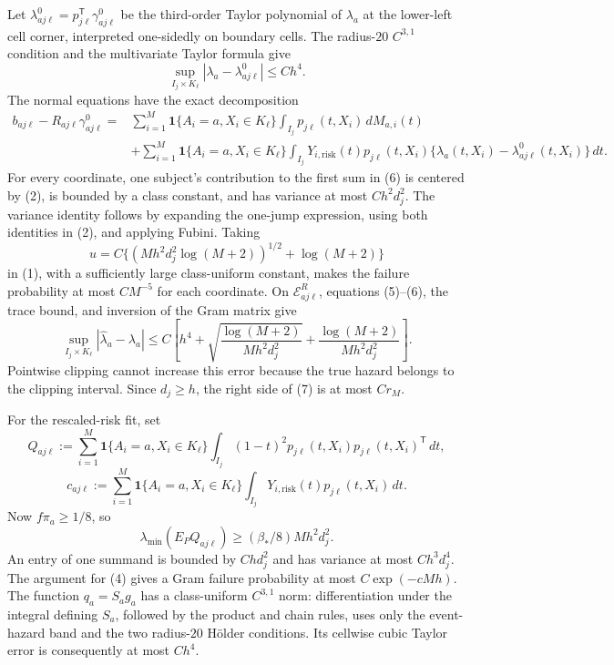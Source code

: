 Let \(\lambda^0_{aj\ell}=p_{j\ell}^{\mathsf T}\gamma^0_{aj\ell}\) be the third-order Taylor polynomial of \(\lambda_a\) at the lower-left cell corner, interpreted one-sidedly on boundary cells. The radius-\(20\) \(C^{3,1}\) condition and the multivariate Taylor formula give
\[
\sup_{I_j\times K_\ell}|\lambda_a-\lambda^0_{aj\ell}|\le Ch^4. \tag{5}
\]
The normal equations have the exact decomposition
\[
\begin{split}
b_{aj\ell}-R_{aj\ell}\gamma^0_{aj\ell}
={}&\sum_{i=1}^M\mathbf 1\{A_i=a,X_i\in K_\ell\}
\int_{I_j}p_{j\ell}(t,X_i)\,dM_{a,i}(t)\\
&+\sum_{i=1}^M\mathbf 1\{A_i=a,X_i\in K_\ell\}
\int_{I_j}Y_{i,\mathrm{risk}}(t)p_{j\ell}(t,X_i)
\{\lambda_a(t,X_i)-\lambda^0_{aj\ell}(t,X_i)\}\,dt.
\end{split} \tag{6}
\]
For every coordinate, one subject's contribution to the first sum in (6) is centered by (2), is bounded by a class constant, and has variance at most \(Ch^2d_j^2\). The variance identity follows by expanding the one-jump expression, using both identities in (2), and applying Fubini. Taking
\[
u=C\{(Mh^2d_j^2\log(M+2))^{1/2}+\log(M+2)\}
\]
in (1), with a sufficiently large class-uniform constant, makes the failure probability at most \(CM^{-5}\) for each coordinate. On \(\mathcal E^R_{aj\ell}\), equations (5)--(6), the trace bound, and inversion of the Gram matrix give
\[
\sup_{I_j\times K_\ell}|\widehat\lambda_a-\lambda_a|
\le C\left[h^4+\sqrt{\frac{\log(M+2)}{Mh^2d_j^2}}
+\frac{\log(M+2)}{Mh^2d_j^2}\right]. \tag{7}
\]
Pointwise clipping cannot increase this error because the true hazard belongs to the clipping interval. Since \(d_j\ge h\), the right side of (7) is at most \(Cr_M\).

For the rescaled-risk fit, set
\[
Q_{aj\ell}:=\sum_{i=1}^M\mathbf 1\{A_i=a,X_i\in K_\ell\}
\int_{I_j}(1-t)^2p_{j\ell}(t,X_i)p_{j\ell}(t,X_i)^{\mathsf T}\,dt,
\]
\[
c_{aj\ell}:=\sum_{i=1}^M\mathbf 1\{A_i=a,X_i\in K_\ell\}
\int_{I_j}Y_{i,\mathrm{risk}}(t)p_{j\ell}(t,X_i)\,dt.
\]
Now \(f\pi_a\ge1/8\), so
\[
\lambda_{\min}(E_PQ_{aj\ell})\ge(\beta_*/8)Mh^2d_j^2. \tag{8}
\]
An entry of one summand is bounded by \(Chd_j^2\) and has variance at most \(Ch^3d_j^4\). The argument for (4) gives a Gram failure probability at most \(C\exp(-cMh)\). The function \(q_a=S_ag_a\) has a class-uniform \(C^{3,1}\) norm: differentiation under the integral defining \(S_a\), followed by the product and chain rules, uses only the event-hazard band and the two radius-\(20\) Hölder conditions. Its cellwise cubic Taylor error is consequently at most \(Ch^4\).

